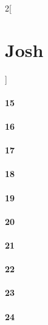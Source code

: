 \documentclass{book}
\begin{document}
\begin{multicols}{2}[\part{Josh}]
\subsection*{15}
\subsection*{16}
\subsection*{17}
\subsection*{18}
\subsection*{19}
\subsection*{20}
\subsection*{21}
\subsection*{22}
\subsection*{23}
\subsection*{24}
\end{multicols}
\end{document}
